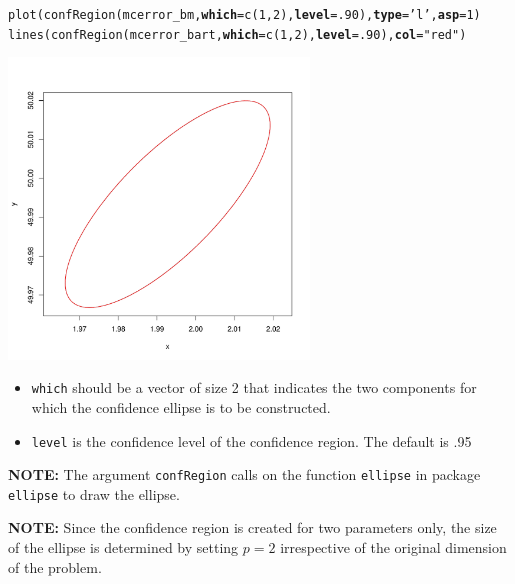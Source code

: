 \documentclass[11pt]{article}\usepackage[]{graphicx}\usepackage[]{color}
\makeatletter
\def\maxwidth{ %
  \ifdim\Gin@nat@width>\linewidth
    \linewidth
  \else
    \Gin@nat@width
  \fi
}
\newcommand{\hlnum}[1]{\textcolor[rgb]{1,0.078,0.576}{#1}}%
\newcommand{\hlstr}[1]{\textcolor[rgb]{1,0.078,0.576}{#1}}%
\newcommand{\hlstd}[1]{\textcolor[rgb]{0,0,0}{#1}}%
\newcommand{\hlkwc}[1]{\textcolor[rgb]{0.412,0.412,0.412}{\textbf{#1}}}%
\newcommand{\hlkwd}[1]{\textcolor[rgb]{0,0,0.561}{#1}}%
\newenvironment{kframe}{%
 \def\at@end@of@kframe{}%
 \ifinner\ifhmode%
  \def\at@end@of@kframe{\end{minipage}}%
  \begin{minipage}{\columnwidth}%
 \fi\fi%
 \def\FrameCommand##1{\hskip\@totalleftmargin \hskip-\fboxsep
 \colorbox{shadecolor}{##1}\hskip-\fboxsep
     \hskip-\linewidth \hskip-\@totalleftmargin \hskip\columnwidth}%
 \MakeFramed {\advance\hsize-\width
   \@totalleftmargin\z@ \linewidth\hsize
   \@setminipage}}%
 {\par\unskip\endMakeFramed%
 \at@end@of@kframe}
\newenvironment{knitrout}{}{} %
\makeatother
\begin{document}
\begin{knitrout}
\color{fgcolor}\begin{kframe}
\begin{alltt}
\hlkwd{plot}\hlstd{(}\hlkwd{confRegion}\hlstd{(mcerror_bm,} \hlkwc{which} \hlstd{=} \hlkwd{c}\hlstd{(}\hlnum{1}\hlstd{,}\hlnum{2}\hlstd{),} \hlkwc{level} \hlstd{=} \hlnum{.90}\hlstd{),} \hlkwc{type} \hlstd{=} \hlstr{'l'}\hlstd{,} \hlkwc{asp} \hlstd{=} \hlnum{1}\hlstd{)}
\hlkwd{lines}\hlstd{(}\hlkwd{confRegion}\hlstd{(mcerror_bart,} \hlkwc{which} \hlstd{=} \hlkwd{c}\hlstd{(}\hlnum{1}\hlstd{,}\hlnum{2}\hlstd{),} \hlkwc{level} \hlstd{=} \hlnum{.90}\hlstd{),} \hlkwc{col} \hlstd{=} \hlstr{"red"}\hlstd{)}
\end{alltt}
\end{kframe}
\includegraphics[width=\maxwidth,height=8cm]{figure/confRegion-1} 

\end{knitrout}

\begin{itemize}
	\item \texttt{which} should be a vector of size 2 that indicates the two components for which the confidence ellipse is to be constructed.

	\item \texttt{level} is the confidence level of the confidence region. The default is .95
\end{itemize}

\bigskip
\textbf{NOTE: }The argument  \texttt{confRegion} calls on the function \texttt{ellipse} in package \texttt{ellipse} to draw the ellipse.

\bigskip
\textbf{NOTE: } Since the confidence region is created for two parameters only, the size of the ellipse is determined by setting $p = 2$ irrespective of the original dimension of the problem.
\end{document}
